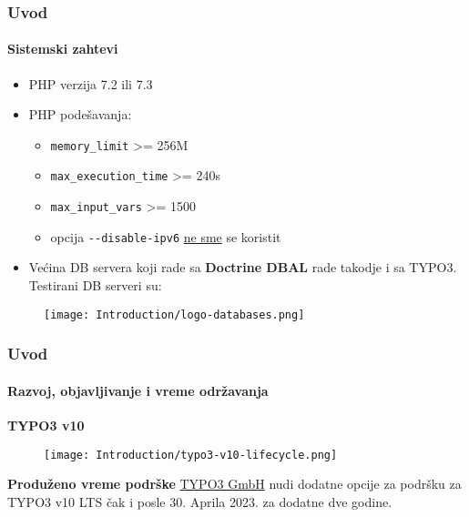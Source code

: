 
\begin{frame}[fragile]
	\frametitle{Uvod}
	\framesubtitle{Sistemski zahtevi}

	\begin{itemize}
		\item PHP verzija 7.2 ili 7.3
		\item PHP podešavanja:

			\begin{itemize}
				\item \texttt{memory\_limit} >= 256M
				\item \texttt{max\_execution\_time} >= 240s
				\item \texttt{max\_input\_vars} >= 1500
				\item opcija \texttt{-}\texttt{-disable-ipv6} \underline{ne sme} se koristit
			\end{itemize}

		\item Većina DB servera koji rade sa \textbf{Doctrine DBAL} rade takodje i sa TYPO3.
			Testirani DB serveri su:
	\end{itemize}

	\begin{figure}
		\texttt{[image: Introduction/logo-databases.png]}
	\end{figure}

\end{frame}


\begin{frame}[fragile]
	\frametitle{Uvod}
	\framesubtitle{Razvoj, objavljivanje i vreme održavanja}

	\textbf{TYPO3 v10}

	\begin{figure}
		\texttt{[image: Introduction/typo3-v10-lifecycle.png]}
	\end{figure}

	\textbf{Produženo vreme podrške}\newline
	\smaller
		\href{https://typo3.com}{TYPO3 GmbH} nudi dodatne opcije za podršku za
		TYPO3 v10 LTS čak i posle 30. Aprila 2023. za dodatne dve godine.
	\normalsize

\end{frame}

